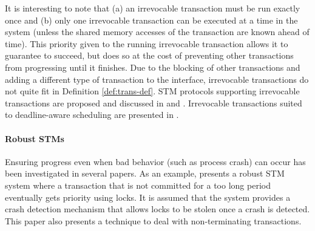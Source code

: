 It is interesting to note that (a) an irrevocable transaction must be run 
exactly  once and (b) only one irrevocable transaction can be executed at 
a time in the system (unless the shared memory accesses of the transaction 
are known ahead of time).
This priority given to the running irrevocable transaction allows it
to guarantee to succeed, but does so at the cost of preventing other
transactions from progressing until it finishes.
Due to the blocking of other transactions and adding a different type of transaction
to the interface, irrevocable transactions do not quite fit in Definition \ref{def:trans-def}.
STM protocols supporting irrevocable transactions are proposed and discussed  in 
\cite{SSDMS08}  and   \cite{WSA08}.  Irrevocable  transactions   suited  to
deadline-aware scheduling are presented  in \cite{MMFLMR11}.



%
%




\paragraph{Robust STMs} 
Ensuring progress even when bad behavior (such as process crash) can occur 
has been investigated in several papers. As an example,  \cite{WRFF10} 
presents a robust STM system where a transaction that is not committed 
for a too long period eventually gets  priority using locks. It is assumed 
that  the system   provides a   crash detection  mechanism that  allows 
locks to be stolen once a  crash  is detected. This paper also presents a
technique to deal with  non-terminating transactions. 


